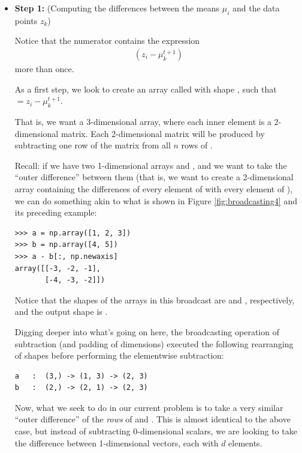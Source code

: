 \begin{itemize}
\item \textbf{Step 1:} (Computing the differences between the means $\mu_i$ and the data points $z_k$)

Notice that the numerator contains the expression
\begin{align*}
(z_i - \mu_k^{t+1})
\end{align*}
more than once.

As a first step, we look to create an array called  with shape , such that \newline \noindent {} $ = z_i - \mu_k^{t+1}$.

That is, we want a 3-dimensional array, where each inner element is a 2-dimensional matrix.
Each 2-dimensional matrix will be produced by subtracting one row of the  matrix from all $n$ rows of .

Recall: if we have two 1-dimensional arrays  and , and we want to take the ``outer difference'' between them (that is, we want to create a 2-dimensional array containing the differences of every element of  with every element of ), we can do something akin to what is shown in Figure \ref{fig:broadcasting4} and its preceding example:

\begin{lstlisting}
>>> a = np.array([1, 2, 3])
>>> b = np.array([4, 5])
>>> a - b[:, np.newaxis]
array([[-3, -2, -1],
       [-4, -3, -2]])
\end{lstlisting}

Notice that the shapes of the arrays in this broadcast are  and , respectively, and the output shape is .

Digging deeper into what's going on here, the broadcasting operation of subtraction (and padding of dimensions) executed the following rearranging of shapes before performing the elementwise subtraction:

\begin{lstlisting}
a	:  (3,) -> (1, 3) -> (2, 3)
b	:  (2,) -> (2, 1) -> (2, 3)
\end{lstlisting}

Now, what we seek to do in our current problem is to take a very similar ``outer difference'' of the \emph{rows} of  and .
This is almost identical to the above case, but instead of subtracting 0-dimensional scalars, we are looking to take the difference between 1-dimensional vectors, each with $d$ elements.


\end{itemize}

